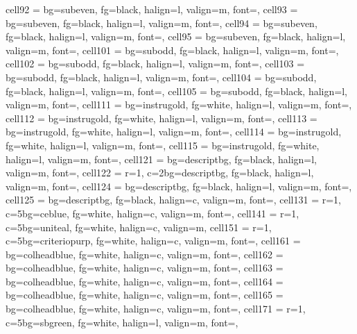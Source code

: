 \documentclass[a4paper,12pt]{article}
\begin{document}
\begin{longtblr}
{  cell{9}{2}  = {bg=subeven, fg=black, halign=l, valign=m, font=\footnotesize},
  cell{9}{3}  = {bg=subeven, fg=black, halign=l, valign=m, font=\footnotesize},
  cell{9}{4}  = {bg=subeven, fg=black, halign=l, valign=m, font=\footnotesize},
  cell{9}{5}  = {bg=subeven, fg=black, halign=l, valign=m, font=\footnotesize},
  cell{10}{1} = {bg=subodd,  fg=black, halign=l, valign=m, font=\footnotesize},
  cell{10}{2} = {bg=subodd,  fg=black, halign=l, valign=m, font=\footnotesize},
  cell{10}{3} = {bg=subodd,  fg=black, halign=l, valign=m, font=\footnotesize},
  cell{10}{4} = {bg=subodd,  fg=black, halign=l, valign=m, font=\footnotesize},
  cell{10}{5} = {bg=subodd,  fg=black, halign=l, valign=m, font=\footnotesize},
  cell{11}{1} = {bg=instrugold, fg=white, halign=l, valign=m, font=\footnotesize},
  cell{11}{2} = {bg=instrugold, fg=white, halign=l, valign=m, font=\footnotesize},
  cell{11}{3} = {bg=instrugold, fg=white, halign=l, valign=m, font=\footnotesize},
  cell{11}{4} = {bg=instrugold, fg=white, halign=l, valign=m, font=\footnotesize},
  cell{11}{5} = {bg=instrugold, fg=white, halign=l, valign=m, font=\footnotesize},
  cell{12}{1} = {bg=descriptbg, fg=black, halign=l, valign=m, font=\footnotesize},
  cell{12}{2} = {r=1, c=2}{bg=descriptbg, fg=black, halign=l, valign=m, font=\footnotesize},
  cell{12}{4} = {bg=descriptbg, fg=black, halign=l, valign=m, font=\footnotesize},
  cell{12}{5} = {bg=descriptbg, fg=black, halign=c, valign=m, font=\footnotesize\bfseries},
  cell{13}{1} = {r=1, c=5}{bg=ceblue, fg=white, halign=c, valign=m, font=\small\bfseries},
  cell{14}{1} = {r=1, c=5}{bg=uniteal, fg=white, halign=c, valign=m},
  cell{15}{1} = {r=1, c=5}{bg=criteriopurp, fg=white, halign=c, valign=m, font=\small\bfseries},
  cell{16}{1} = {bg=colheadblue, fg=white, halign=c, valign=m, font=\bfseries},
  cell{16}{2} = {bg=colheadblue, fg=white, halign=c, valign=m, font=\bfseries},
  cell{16}{3} = {bg=colheadblue, fg=white, halign=c, valign=m, font=\bfseries},
  cell{16}{4} = {bg=colheadblue, fg=white, halign=c, valign=m, font=\bfseries},
  cell{16}{5} = {bg=colheadblue, fg=white, halign=c, valign=m, font=\bfseries},
  cell{17}{1} = {r=1, c=5}{bg=sbgreen, fg=white, halign=l, valign=m, font=\small\bfseries},
}
\end{longtblr}
\end{document}
